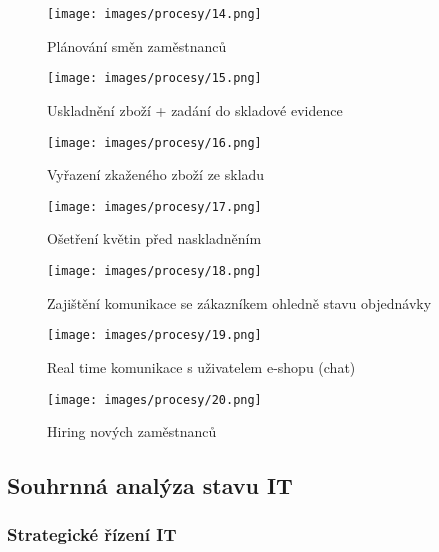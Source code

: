 \documentclass{article}
\begin{document}
\newpage
\begin{figure}[h]
\caption{Plánování směn zaměstnanců}
\texttt{[image: images/procesy/14.png]}
\end{figure}

\newpage
\begin{figure}[h]
\caption{Uskladnění zboží + zadání do skladové evidence}
\texttt{[image: images/procesy/15.png]}
\end{figure}

\newpage
\begin{figure}[h]
\caption{Vyřazení zkaženého zboží ze skladu}
\texttt{[image: images/procesy/16.png]}
\end{figure}

\newpage
\begin{figure}[h]
\caption{Ošetření květin před naskladněním}
\texttt{[image: images/procesy/17.png]}
\end{figure}

\newpage
\begin{figure}[h]
\caption{Zajištění komunikace se zákazníkem ohledně stavu objednávky}
\texttt{[image: images/procesy/18.png]}
\end{figure}

\newpage
\begin{figure}[h]
\centering
\caption{Real time komunikace s uživatelem e-shopu (chat)}
\texttt{[image: images/procesy/19.png]}
\end{figure}

\newpage
\begin{figure}[h]
\caption{Hiring nových zaměstnanců}
\texttt{[image: images/procesy/20.png]}
\end{figure}

\newpage

\subsection*{Souhrnná analýza stavu IT}

\subsubsection*{Strategické řízení IT}
\end{document}
